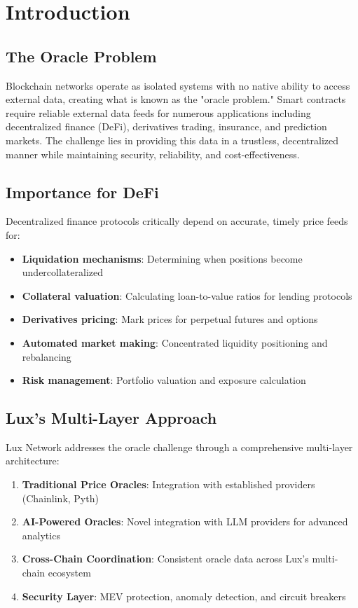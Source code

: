 \section{Introduction}


\subsection{The Oracle Problem}

Blockchain networks operate as isolated systems with no native ability to access external data, creating what is known as the "oracle problem." Smart contracts require reliable external data feeds for numerous applications including decentralized finance (DeFi), derivatives trading, insurance, and prediction markets. The challenge lies in providing this data in a trustless, decentralized manner while maintaining security, reliability, and cost-effectiveness.

\subsection{Importance for DeFi}

Decentralized finance protocols critically depend on accurate, timely price feeds for:

\begin{itemize}
    \item \textbf{Liquidation mechanisms}: Determining when positions become undercollateralized
    \item \textbf{Collateral valuation}: Calculating loan-to-value ratios for lending protocols
    \item \textbf{Derivatives pricing}: Mark prices for perpetual futures and options
    \item \textbf{Automated market making}: Concentrated liquidity positioning and rebalancing
    \item \textbf{Risk management}: Portfolio valuation and exposure calculation
\end{itemize}

\subsection{Lux's Multi-Layer Approach}

Lux Network addresses the oracle challenge through a comprehensive multi-layer architecture:

\begin{enumerate}
    \item \textbf{Traditional Price Oracles}: Integration with established providers (Chainlink, Pyth)
    \item \textbf{AI-Powered Oracles}: Novel integration with LLM providers for advanced analytics
    \item \textbf{Cross-Chain Coordination}: Consistent oracle data across Lux's multi-chain ecosystem
    \item \textbf{Security Layer}: MEV protection, anomaly detection, and circuit breakers
\end{enumerate}

